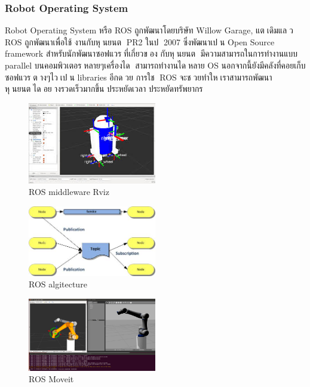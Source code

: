 \subsubsection*{Robot Operating System}
Robot Operating System หรือ ROS ถูกพัฒนาโดยบริษัท Willow Garage, แตเดิมแลว ROS ถูกพัฒนาเพื่อใช้
งานกับหุนยนต PR2 ในป 2007 ซึ่งพัฒนาเปน Open Source framework สําหรับนักพัฒนาซอฟแวรที่เกี่ยวของ
กับหุนยนต มีความสามารถในการทํางานแบบ parallel บนคอมพิวเตอรหลายๆเครื่องได สามารถทํางานไดหลาย
OS นอกจากนี้ยังมีคลังที่คอยเก็บซอฟแวรตางๆไวเปน libraries อีกดวย การใช ROS
จะชวยทําใหเราสามารถพัฒนาหุนยนตไดอยางรวดเร็วมากขึ้น ประหยัดเวลา ประหยัดทรัพยากร

\begin{figure}[!ht]
    \centering
    \includegraphics[width=0.5\textwidth]{chapter2/images/mdw_ros.jpeg}
    \caption{ROS middleware Rviz}
    \label{fig:mdw_ros}
\end{figure}
\begin{figure}[!ht]
    \centering
    \includegraphics[width=0.5\textwidth]{chapter2/images/mdw_ros2.jpeg}
    \caption{ROS algitecture}
    \label{fig:mdw_ros2}
\end{figure}
\begin{figure}[!ht]
    \centering
    \includegraphics[width=0.5\textwidth]{chapter2/images/mdw_ros3.jpeg}
    \caption{ROS Moveit}
    \label{fig:mdw_ros3}
\end{figure}

